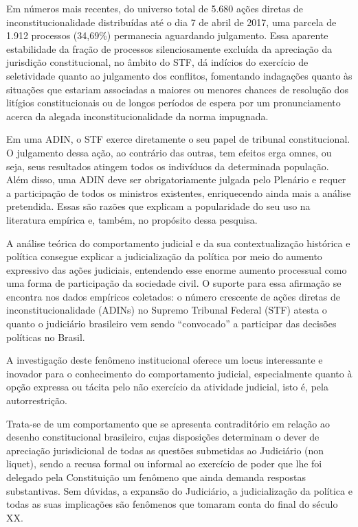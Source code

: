 \documentclass[]{article}
\begin{document}
Em números mais recentes, do universo total de 5.680 ações diretas de
inconstitucionalidade distribuídas até o dia 7 de abril de 2017, uma
parcela de 1.912 processos (34,69\%) permanecia aguardando julgamento.
Essa aparente estabilidade da fração de processos silenciosamente
excluída da apreciação da jurisdição constitucional, no âmbito do STF,
dá indícios do exercício de seletividade quanto ao julgamento dos
conflitos, fomentando indagações quanto às situações que estariam
associadas a maiores ou menores chances de resolução dos litígios
constitucionais ou de longos períodos de espera por um pronunciamento
acerca da alegada inconstitucionalidade da norma impugnada.

Em uma ADIN, o STF exerce diretamente o seu papel de tribunal
constitucional. O julgamento dessa ação, ao contrário das outras, tem
efeitos erga omnes, ou seja, seus resultados atingem todos os indivíduos
da determinada população. Além disso, uma ADIN deve ser obrigatoriamente
julgada pelo Plenário e requer a participação de todos os ministros
existentes, enriquecendo ainda mais a análise pretendida. Essas são
razões que explicam a popularidade do seu uso na literatura empírica e,
também, no propósito dessa pesquisa.

A análise teórica do comportamento judicial e da sua contextualização
histórica e política consegue explicar a judicialização da política por
meio do aumento expressivo das ações judiciais, entendendo esse enorme
aumento processual como uma forma de participação da sociedade civil. O
suporte para essa afirmação se encontra nos dados empíricos coletados: o
número crescente de ações diretas de inconstitucionalidade (ADINs) no
Supremo Tribunal Federal (STF) atesta o quanto o judiciário brasileiro
vem sendo ``convocado'' a participar das decisões políticas no Brasil.

A investigação deste fenômeno institucional oferece um locus
interessante e inovador para o conhecimento do comportamento judicial,
especialmente quanto à opção expressa ou tácita pelo não exercício da
atividade judicial, isto é, pela autorrestrição.

Trata-se de um comportamento que se apresenta contraditório em relação
ao desenho constitucional brasileiro, cujas disposições determinam o
dever de apreciação jurisdicional de todas as questões submetidas ao
Judiciário (non liquet), sendo a recusa formal ou informal ao exercício
de poder que lhe foi delegado pela Constituição um fenômeno que ainda
demanda respostas substantivas. Sem dúvidas, a expansão do Judiciário, a
judicialização da política e todas as suas implicações são fenômenos que
tomaram conta do final do século XX.
\end{document}
